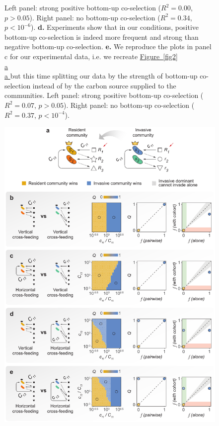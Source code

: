 \documentclass[a4paper,10pt]{article}
\newcommand{\figref}[2][]{%
  \hyperref[{#2}]{%
    Figure~\ref*{#2}%
    \ifx\\#1\\%
    \else
      #1%
    \fi
  }%
}
\begin{document}
\begin{figure}[!h]
{Left panel: strong positive bottom-up co-selection
($R^2=0.00$, $p>0.05$).
Right panel: no bottom-up co-selection
($R^2=0.34$, $p<10^{-6}$).
\textbf{d.} Experiments show that in our conditions, positive bottom-up co-selection is indeed more
frequent and strong than negative bottom-up co-selection.
\textbf{e.} We reproduce the plots in panel c for our experimental data,
i.e. we recreate
\figref[a]{fig2} but this time splitting our data by the strength of bottom-up co-selection
instead of by the carbon source supplied to the communities.
Left panel: strong positive bottom-up co-selection
($R^2=0.07$, $p>0.05$).
Right panel: no bottom-up co-selection
($R^2=0.37$, $p<10^{-4}$).}
\label{fig3}
\end{figure}

\clearpage

\begin{figure}[!h]
\centering
\internallinenumbers
\includegraphics[scale=0.7,keepaspectratio]{figs/fig4_v4.pdf}

\end{figure}
\end{document}
